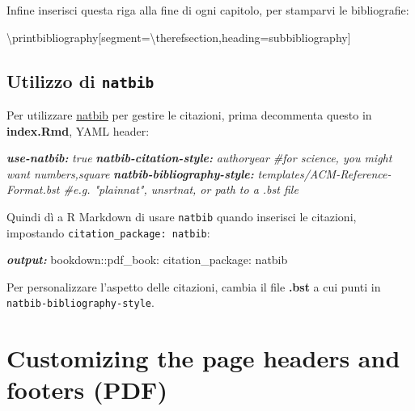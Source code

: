 \documentclass[a4paper, 11pt, nobind]{templates/ociamthesis}
\newenvironment{Shaded}{\begin{snugshade}}{\end{snugshade}}
\newcommand{\AnnotationTok}[1]{\textcolor[rgb]{0.56,0.35,0.01}{\textbf{\textit{#1}}}}
\newcommand{\CommentTok}[1]{\textcolor[rgb]{0.56,0.35,0.01}{\textit{#1}}}
\newcommand{\FunctionTok}[1]{\textcolor[rgb]{0.00,0.00,0.00}{#1}}
\newcommand{\NormalTok}[1]{#1}
\renewenvironment{Shaded}
{
  \vspace{10pt}%
  \begin{snugshade}%
}{%
  \end{snugshade}%
  \vspace{8pt}%
}
\begin{document}
Infine inserisci questa riga alla fine di ogni capitolo, per stamparvi le bibliografie:

\begin{Shaded}
\begin{Highlighting}[]
\FunctionTok{\textbackslash{}printbibliography}\NormalTok{[segment=}\FunctionTok{\textbackslash{}therefsection}\NormalTok{,heading=subbibliography]}
\end{Highlighting}
\end{Shaded}

\hypertarget{natbib-custom}{%
\subsection{\texorpdfstring{Utilizzo di \texttt{natbib}}{Utilizzo di natbib}}\label{natbib-custom}}

Per utilizzare \href{https://www.overleaf.com/learn/latex/Bibliography_management_with_natbib}{natbib} per gestire le citazioni, prima decommenta questo in \textbf{index.Rmd}, YAML header:

\begin{Shaded}
\begin{Highlighting}[]
\AnnotationTok{use{-}natbib:}\CommentTok{ true}
\AnnotationTok{natbib{-}citation{-}style:}\CommentTok{ authoryear \#for science, you might want numbers,square}
\AnnotationTok{natbib{-}bibliography{-}style:}\CommentTok{ templates/ACM{-}Reference{-}Format.bst \#e.g. "plainnat", unsrtnat, or path to a .bst file}
\end{Highlighting}
\end{Shaded}

Quindi dì a R Markdown di usare \texttt{natbib} quando inserisci le citazioni, impostando \texttt{citation\_package:\ natbib}:

\begin{Shaded}
\begin{Highlighting}[]
\AnnotationTok{output:}
\NormalTok{  bookdown::pdf\_book:}
\NormalTok{    citation\_package: natbib}
\end{Highlighting}
\end{Shaded}

Per personalizzare l'aspetto delle citazioni, cambia il file \textbf{.bst} a cui punti in \texttt{natbib-bibliography-style}.

\hypertarget{customizing-the-page-headers-and-footers-pdf}{%
\section{Customizing the page headers and footers (PDF)}\label{customizing-the-page-headers-and-footers-pdf}}
\end{document}
